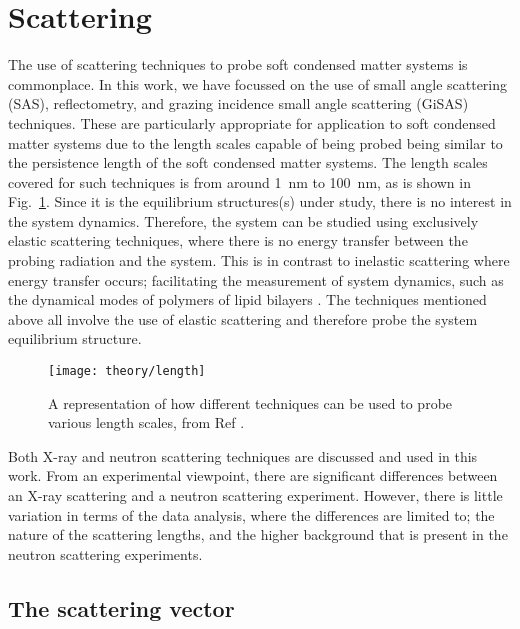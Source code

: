 \section{Scattering}
\label{sec:scattering}

The use of scattering techniques to probe soft condensed matter systems is commonplace.
In this work, we have focussed on the use of small angle scattering (SAS), reflectometry, and grazing incidence small angle scattering (GiSAS) techniques.
These are particularly appropriate for application to soft condensed matter systems due to the length scales capable of being probed being similar to the persistence length of the soft condensed matter systems.
The length scales covered for such techniques is from around \SI{1}{\nano\metre} to \SI{100}{\nano\metre}, as is shown in Fig.~\ref{fig:lengths}.
Since it is the equilibrium structures(s) under study, there is no interest in the system dynamics.
Therefore, the system can be studied using exclusively elastic scattering techniques, where there is no energy transfer between the probing radiation and the system.
This is in contrast to inelastic scattering where energy transfer occurs; facilitating the measurement of system dynamics, such as the dynamical modes of polymers of lipid bilayers \cite{Sakai2009, Farago2009}.
The techniques mentioned above all involve the use of elastic scattering and therefore probe the system equilibrium structure.
%
\begin{figure}
	\centering
	\texttt{[image: theory/length]}
	\caption{A representation of how different techniques can be used to probe various length scales, from Ref \cite{Sivia2011}.}
	\label{fig:lengths}
\end{figure}
%

Both X-ray and neutron scattering techniques are discussed and used in this work.
From an experimental viewpoint, there are significant differences between an X-ray scattering and a neutron scattering experiment.
However, there is little variation in terms of the data analysis, where the differences are limited to; the nature of the scattering lengths, and the higher background that is present in the neutron scattering experiments.

\subsection{The scattering vector}

